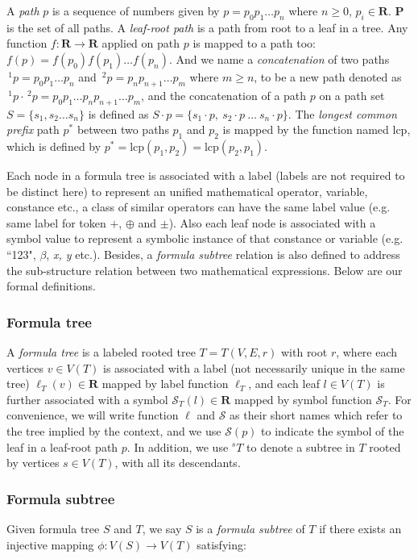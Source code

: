 A \textit{path} $p$ is a sequence of numbers given by $p = p_0 p_1 \ldots p_n$ where $n\ge0$, $p_i \in \mathbf{R}$. $\mathbf{P}$ is the set of all paths.
A \textit{leaf-root path} is a path from root to a leaf in a tree.
Any function $f: \mathbf{R} \rightarrow \mathbf{R}$ applied on path $p$ is mapped to a path too: $f(p)=f(p_0)f(p_1) \ldots f(p_n)$.
And we name  a \textit{concatenation} of two paths $\,^1p = p_0p_1 \ldots p_n$ and $\,^2p = p_np_{n+1} \ldots p_m$ where $m \ge n$, to be a new path denoted as $\,^1p \cdot \,^2p = p_0p_1 \ldots p_n p_{n+1} \ldots p_m$,
and the concatenation of a path $p$ on a path set $S = \{ s_1, s_2 \ldots s_n \}$ is defined as $S \cdot p = \{ s_1\cdot p,\  s_2\cdot p \ \ldots \ s_n\cdot p \}$.
The \textit{longest common prefix} path $p^*$ between two paths $p_1$ and $p_2$ is mapped by the function named $\mathrm{lcp}$, which is defined by $p^* = \mathrm{lcp}(p_1, p_2) = \mathrm{lcp}(p_2, p_1)$.

Each node in a formula tree is associated with a label (labels are not required to be distinct here) to represent an unified mathematical operator, variable, constance etc., 
 a class of similar operators can have the same label value (e.g. same label for token $+$, $\oplus$ and $\pm$).
Also each leaf node is associated with a symbol value to represent a symbolic instance of that constance or variable (e.g. ``123", $\beta$, \textit{x, y} etc.). 
Besides, a \textit{formula subtree} relation is also defined to address the sub-structure relation between two mathematical expressions.
Below are our formal definitions.

\subsubsection{Formula tree}
A \textit{formula tree} is a labeled rooted tree $T = T(V,E,r)$ with root $r$, where each vertices $v \in V(T)$ is associated with a label (not necessarily unique in the same tree) $\ell_T(v) \in \mathbf{R}$ mapped by label function $\ell_T$,
and each leaf $l \in V(T)$ is further associated with a symbol $\mathcal{S}_T(l) \in \mathbf{R}$ mapped by symbol function $\mathcal{S}_T$. 
For convenience, we will write function $\ell$ and $\mathcal{S}$ as their short names which refer to the tree implied by the context, and we use $\mathcal{S}(p)$ to indicate the symbol of the leaf in a leaf-root path $p$.
In addition, we use $^s T$ to denote a subtree in $T$ rooted by vertices $s \in V(T)$, with all its descendants.

\subsubsection{Formula subtree}
\label{frmlsubtreeDef}
Given formula tree $S$ and $T$, we say $S$ is a \textit{formula subtree} of $T$ if there exists an injective mapping $\phi: V(S) \rightarrow V(T)$ satisfying:

